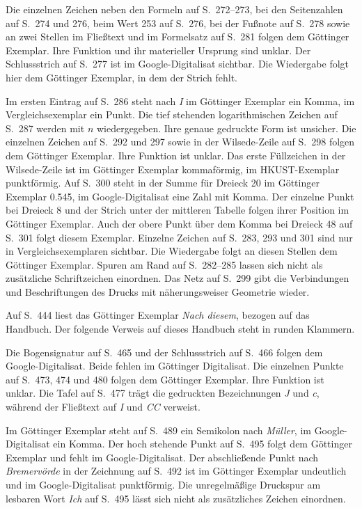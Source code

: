 Die einzelnen Zeichen neben den Formeln auf S.~272--273, bei den
Seitenzahlen auf S.~274 und 276, beim Wert 253 auf S.~276, bei der
Fußnote auf S.~278 sowie an zwei Stellen im Fließtext und im
Formelsatz auf S.~281 folgen dem Göttinger Exemplar. Ihre Funktion
und ihr materieller Ursprung sind unklar. Der Schlussstrich auf
S.~277 ist im Google-Digitalisat sichtbar. Die Wiedergabe folgt hier
dem Göttinger Exemplar, in dem der Strich fehlt.

Im ersten Eintrag auf S.~286 steht nach \emph{I} im Göttinger
Exemplar ein Komma, im Vergleichsexemplar ein Punkt. Die tief
stehenden logarithmischen Zeichen auf S.~287 werden mit \(n\)
wiedergegeben. Ihre genaue gedruckte Form ist unsicher. Die einzelnen
Zeichen auf S.~292 und 297 sowie in der Wilsede-Zeile auf S.~298
folgen dem Göttinger Exemplar. Ihre Funktion ist unklar. Das erste
Füllzeichen in der Wilsede-Zeile ist im Göttinger Exemplar
kommaförmig, im HKUST-Exemplar punktförmig. Auf S.~300 steht in der
Summe für Dreieck 20 im Göttinger Exemplar \mbox{0.545}, im
Google-Digitalisat eine Zahl mit Komma. Der einzelne Punkt bei
Dreieck 8 und der Strich unter der mittleren Tabelle folgen ihrer
Position im Göttinger Exemplar. Auch der obere Punkt über dem
Komma bei Dreieck 48 auf S.~301 folgt diesem Exemplar. Einzelne
Zeichen auf S.~283, 293 und 301 sind nur in Vergleichsexemplaren
sichtbar. Die Wiedergabe folgt an diesen Stellen dem Göttinger
Exemplar. Spuren am Rand auf S.~282--285 lassen sich nicht als
zusätzliche Schriftzeichen einordnen. Das Netz auf S.~299 gibt die
Verbindungen und Beschriftungen des Drucks mit näherungsweiser
Geometrie wieder.

Auf S.~444 liest das Göttinger Exemplar \emph{Nach diesem}, bezogen auf das Handbuch. Der folgende Verweis auf dieses Handbuch steht in runden Klammern.

Die Bogensignatur auf S.~465 und der Schlussstrich auf S.~466 folgen
dem Google-Digitalisat. Beide fehlen im Göttinger Digitalisat.
Die einzelnen Punkte auf S.~473, 474 und 480 folgen dem Göttinger
Exemplar. Ihre Funktion ist unklar. Die Tafel auf S.~477 trägt die
gedruckten Bezeichnungen \emph{J} und \emph{c}, während der
Fließtext auf \emph{I} und \emph{CC} verweist.

Im Göttinger Exemplar steht auf S.~489 ein Semikolon nach \emph{Müller}, im Google-Digitalisat ein Komma. Der hoch stehende Punkt auf S.~495 folgt dem Göttinger Exemplar und fehlt im Google-Digitalisat. Der abschließende Punkt nach \emph{Bremervörde} in der
Zeichnung auf S.~492 ist im Göttinger Exemplar undeutlich und im
Google-Digitalisat punktförmig. Die unregelmäßige Druckspur am
lesbaren Wort \emph{Ich} auf S.~495 lässt sich nicht als
zusätzliches Zeichen einordnen.

